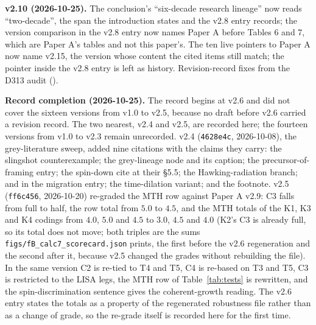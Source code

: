 \documentclass[11pt]{article}
\begin{document}
\textbf{v2.10 (2026-10-25).} The conclusion's ``six-decade research lineage'' now reads ``two-decade'', the span the introduction states and the v2.8 entry records; the version comparison in the v2.8 entry now names Paper A before Tables 6 and 7, which are Paper A's tables and not this paper's. The ten live pointers to Paper A now name v2.15, the version whose content the cited items still match; the pointer inside the v2.8 entry is left as history. Revision-record fixes from the D313 audit ().

\textbf{Record completion (2026-10-25).} The record begins at v2.6 and did not cover the sixteen versions from v1.0 to v2.5, because no draft before v2.6 carried a revision record. The two nearest, v2.4 and v2.5, are recorded here; the fourteen versions from v1.0 to v2.3 remain unrecorded. v2.4 (\texttt{4628e4c}, 2026-10-08), the grey-literature sweep, added nine citations with the claims they carry: the \citet{Gould2022} slingshot counterexample; the \citet{Lefebvre2000} grey-lineage node and its caption; the \citet{Kriger2026} precursor-of-framing entry; the \citet{Vidal2026Review} spin-down cite at their \S5.5; the \citet{Crane2009} Hawking-radiation branch; \citet{Wright2023Landsberg} and \citet{Garrett2026Slysh} in the migration entry; the \citet{ReissFeng2026} time-dilation variant; and the \citet{Gindilis2019} footnote. v2.5 (\texttt{ff6c456}, 2026-10-20) re-graded the MTH row against Paper A v2.9: C3 falls from full to half, the row total from $5.0$ to $4.5$, and the MTH totals of the K1, K3 and K4 codings from $4.0$, $5.0$ and $4.5$ to $3.0$, $4.5$ and $4.0$ (K2's C3 is already full, so its total does not move; both triples are the sums \texttt{figs/fB\_calc7\_scorecard.json} prints, the first before the v2.6 regeneration and the second after it, because v2.5 changed the grades without rebuilding the file). In the same version C2 is re-tied to T4 and T5, C4 is re-based on T3 and T5, C3 is restricted to the LISA legs, the MTH row of Table~\ref{tab:tests} is rewritten, and the spin-discrimination sentence gives the coherent-growth reading. The v2.6 entry states the totals as a property of the regenerated robustness file rather than as a change of grade, so the re-grade itself is recorded here for the first time.
\end{document}
